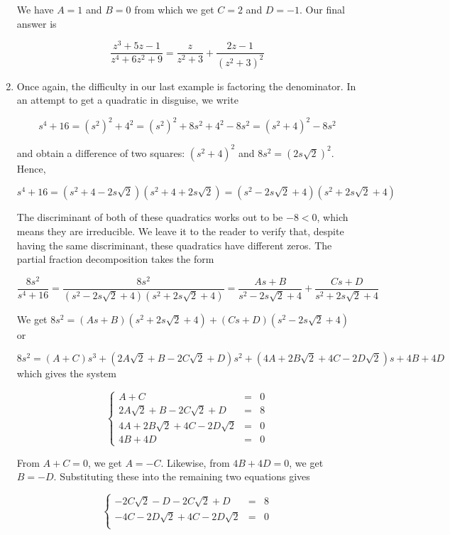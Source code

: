 \documentclass{ximera}
\begin{document}
\begin{example}
\begin{enumerate}
We have $A = 1$ and $B = 0$ from which we get $C = 2$ and $D = -1$.  Our final answer is

\[ \dfrac{z^3+5z-1}{z^4+6z^2+9} = \dfrac{z}{z^2+3} + \dfrac{2z-1}{\left(z^2+3\right)^2}\]

\item  Once again, the difficulty in our last example is factoring the denominator.  In an attempt to get a quadratic in disguise, we write 

\[s^4 + 16 = \left(s^2\right)^2 + 4^2 = \left(s^2\right)^2 + 8s^2 + 4^2 - 8s^2 = \left(s^2+4\right)^2 - 8s^2\]

and obtain a difference of two squares:  $\left(s^2+4\right)^2$ and $8s^2 = \left(2s\sqrt{2}\right)^2$.  Hence,

\[s^4 + 16 = \left(s^2 + 4 - 2s\sqrt{2}\right)\left(s^2 + 4 + 2s\sqrt{2}\right) =\left(s^2 - 2s\sqrt{2} + 4\right)\left(s^2 + 2s\sqrt{2}+4 \right)  \]

The discriminant of both of these quadratics works out to be $-8 < 0$, which means they are irreducible.  We leave it to the reader to verify that, despite having the same discriminant, these quadratics have different zeros.  The partial fraction decomposition takes the form

\[ \dfrac{8s^2}{s^4+16} = \dfrac{8s^2}{\left(s^2 - 2s\sqrt{2} + 4\right)\left(s^2 + 2s\sqrt{2}+4 \right)} = \dfrac{As+B}{s^2 - 2s\sqrt{2} + 4} + \dfrac{Cs+D}{s^2 + 2s\sqrt{2} + 4}\]

We get $8s^2 = (As+B)\left(s^2 + 2s\sqrt{2}+4 \right) + (Cs+D)\left(s^2 - 2s\sqrt{2} + 4\right)$ or 

\[8s^2 = (A+C)s^3 + (2A\sqrt{2} + B - 2C\sqrt{2}+D)s^2 + (4A + 2B\sqrt{2}+4C - 2D\sqrt{2})s + 4B + 4D \] which gives the system

\[ \left\{ \begin{array}{rcr} A + C & = & 0 \\ 2A\sqrt{2} + B - 2C\sqrt{2}+D & = & 8 \\ 4A + 2B\sqrt{2}+4C - 2D\sqrt{2} & = & 0 \\ 4B + 4D  & = & 0 \end{array} \right.\]

From $A+C = 0$, we get $A = -C$.  Likewise, from $4B + 4D = 0$, we get $B = -D$.  Substituting these into the remaining two equations gives

\[ \left\{ \begin{array}{rcr}  -2C\sqrt{2} -D - 2C\sqrt{2}+D & = & 8 \\ -4C - 2D\sqrt{2}+4C - 2D\sqrt{2} & = & 0 \\ \end{array} \right.\] 


\end{enumerate}
\end{example}
\end{document}

